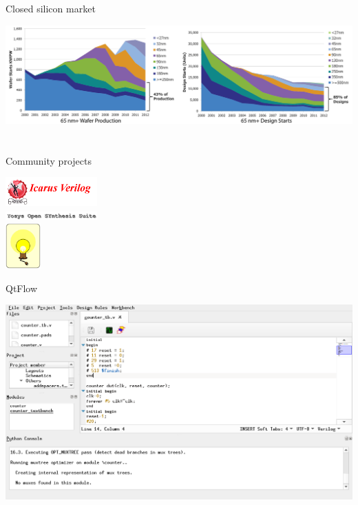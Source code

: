 \documentclass[9pt]{beamer}
\begin{document}
\begin{frame}{Closed silicon market}
	\begin{center}
		\hspace*{-0.3in}
		\includegraphics[width=1.15\textwidth]{market-closing.png} \\
	\end{center}
	
\end{frame}

\section[Who]{}
\begin{frame}{Community projects}
	\begin{center}
		\includegraphics[width=100pt]{Icarus.png} \\
		\includegraphics[width=100pt]{Yosys.png} \\
		\includegraphics[height=50pt]{Opencircuit.png}
	\end{center}
\end{frame}

\begin{frame}{QtFlow}
	\begin{center}
		\hspace*{-0.3in}
		\includegraphics[width=1.15\textwidth]{qtflow1.png} \\
	\end{center}
\end{frame}
\end{document}
